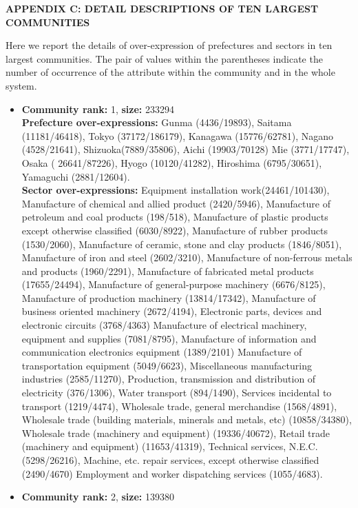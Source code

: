 \documentclass[pre,floatfix,twocolumn,showpacs,a4paper,nofootinbib]{revtex4}
\begin{document}
\begin{center}
{\bf APPENDIX C: DETAIL DESCRIPTIONS OF TEN LARGEST COMMUNITIES}
\end{center}
Here we report the details of over-expression of prefectures and sectors in ten largest communities.
The pair of values within the parentheses indicate the number of occurrence of the attribute within the community 
and in the whole system. 
\begin {itemize}
\item {\bf Community rank:} 1, {\bf size:} 233294\\
{\bf Prefecture over-expressions:} Gunma (4436/19893), Saitama (11181/46418), Tokyo (37172/186179), 
Kanagawa (15776/62781), Nagano (4528/21641), Shizuoka(7889/35806), Aichi (19903/70128)
Mie (3771/17747), Osaka ( 26641/87226), Hyogo (10120/41282), Hiroshima (6795/30651), Yamaguchi (2881/12604).\\
{\bf Sector over-expressions:} Equipment installation work(24461/101430), Manufacture of chemical and allied product (2420/5946),
Manufacture of petroleum and coal products (198/518), Manufacture of plastic products except otherwise classified (6030/8922),
Manufacture of rubber products (1530/2060), Manufacture of ceramic, stone and clay products (1846/8051), Manufacture of iron and steel (2602/3210),
Manufacture of non-ferrous metals and products (1960/2291), Manufacture of fabricated metal products (17655/24494),
Manufacture of general-purpose machinery (6676/8125), Manufacture of production machinery (13814/17342),
Manufacture of business oriented machinery (2672/4194), Electronic parts, devices and electronic circuits (3768/4363)
Manufacture of electrical machinery, equipment and supplies (7081/8795), Manufacture of information and communication electronics equipment (1389/2101)
Manufacture of transportation equipment (5049/6623), Miscellaneous manufacturing industries (2585/11270),
Production, transmission and distribution of electricity (376/1306), Water transport (894/1490), Services incidental to transport (1219/4474),
Wholesale trade, general merchandise (1568/4891), Wholesale trade (building materials, minerals and metals, etc) (10858/34380), 
Wholesale trade (machinery and equipment) (19336/40672), Retail trade (machinery and equipment) (11653/41319),
Technical services, N.E.C. (5298/26216), Machine, etc. repair services, except otherwise classified (2490/4670)
Employment and worker dispatching services (1055/4683).
\item {\bf Community rank:} 2, {\bf size:} 139380\\

\end{itemize}
\end{document}
